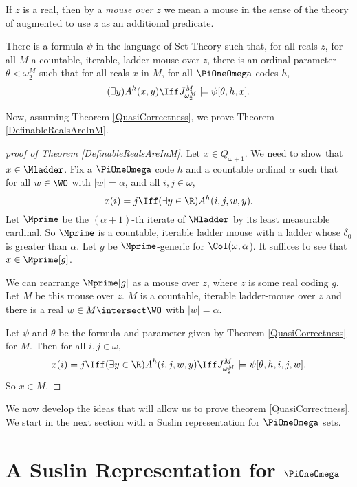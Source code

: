 \documentclass[oneside,12pt]{amsart}
\begin{document}
If $z$ is a real, then by a \emph{mouse over $z$} we mean a mouse in the
sense of the theory of \cite{FSIT} augmented to use $z$ as an additional predicate.

\begin{theorem}
\label{QuasiCorrectness}
There is a formula $\psi$ in the language of Set Theory such that, for all
reals $z$, for all $M$ a countable, iterable, ladder-mouse over $z$,
there is an ordinal parameter $\theta<\omega_2^M$ such that
for all reals $x$ in $M$,
for all $\PiOneOmega$ codes $h$,
$$(\exists y) A^h(x,y) \Iff J^M_{\omega_2^M} \models \psi[\theta, h,x].$$
\end{theorem}

Now, assuming Theorem \ref{QuasiCorrectness}, we prove Theorem \ref{DefinableRealsAreInM}.

\begin{proof}[proof of Theorem \ref{DefinableRealsAreInM}]
Let $x\in Q_{\omega+1}$. We need to show that $x\in\Mladder$.
Fix a $\PiOneOmega$ code $h$ and a countable ordinal $\alpha$ such that for
all $w\in\WO$ with $|w|=\alpha$, and all $i,j\in\omega$,
$$x(i)=j \Iff (\exists y\in\R)A^h(i,j,w,y).$$
Let $\Mprime$ be the $(\alpha+1)$-th iterate of $\Mladder$ by its least
measurable cardinal. So $\Mprime$ is a countable, iterable ladder mouse with
a ladder whose $\delta_0$ is greater than $\alpha$. Let $g$ be $\Mprime$-generic
for $\Col(\omega,\alpha$). It suffices to see that $x\in\Mprime[g]$.

We can rearrange $\Mprime[g]$ as a mouse over $z$, where $z$ is some real coding $g$.
Let $M$ be this mouse over $z$. $M$ is a countable, iterable ladder-mouse over $z$ and there
is a real $w\in M\intersect\WO$ with $|w|=\alpha$.

Let $\psi$ and $\theta$ be the formula and parameter given by Theorem \ref{QuasiCorrectness}
for $M$. Then for all
$i,j\in\omega$,
$$x(i)=j \Iff (\exists y\in\R)A^h(i,j,w,y) \Iff J^M_{\omega_2^M} \models \psi[\theta,h,i,j,w].$$
So $x\in M$.
\end{proof}


We now develop the ideas that will allow us to prove theorem \ref{QuasiCorrectness}. We
start in the next section with a Suslin representation for $\PiOneOmega$ sets.

\section{A Suslin Representation for $\PiOneOmega$}
\label{section:suslinrep}
\end{document}

